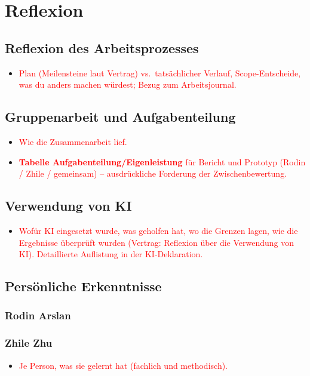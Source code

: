 \documentclass[../Main.tex]{subfiles}
\begin{document}
\section{Reflexion} \label{sec:Reflexion}

\subsection{Reflexion des Arbeitsprozesses}

\begin{itemize}[leftmargin=1.5cm]
    \item \textcolor{red}{Plan (Meilensteine laut Vertrag) vs.\ tatsächlicher Verlauf, Scope-Entscheide, was du anders machen würdest; Bezug zum Arbeitsjournal.}
\end{itemize}

\subsection{Gruppenarbeit und Aufgabenteilung}

\begin{itemize}[leftmargin=1.5cm]
    \item \textcolor{red}{Wie die Zusammenarbeit lief.}
    \item \textcolor{red}{\textbf{Tabelle Aufgabenteilung/Eigenleistung} für Bericht und Prototyp (Rodin / Zhile / gemeinsam) -- ausdrückliche Forderung der Zwischenbewertung.}
\end{itemize}

\subsection{Verwendung von KI} \label{sec:ReflexionKI}

\begin{itemize}[leftmargin=1.5cm]
    \item \textcolor{red}{Wofür KI eingesetzt wurde, was geholfen hat, wo die Grenzen lagen, wie die Ergebnisse überprüft wurden (Vertrag: Reflexion über die Verwendung von KI). Detaillierte Auflistung in der KI-Deklaration.}
\end{itemize}

\subsection{Persönliche Erkenntnisse}

\subsubsection{Rodin Arslan}

\subsubsection{Zhile Zhu}

\begin{itemize}[leftmargin=1.5cm]
    \item \textcolor{red}{Je Person, was sie gelernt hat (fachlich und methodisch).}
\end{itemize}
\end{document}
